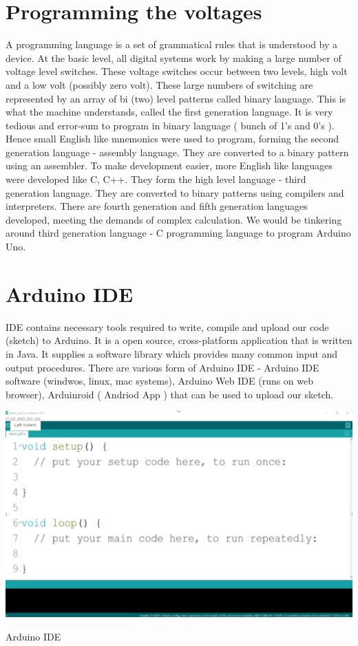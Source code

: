 \section{Programming the voltages}
\par A programming language is a set of grammatical rules that is understood by a device. At the basic level, all digital systems work by making a large number of voltage level switches. These voltage switches occur between two levels, high volt and a low volt (possibly zero volt). These large numbers of switching are represented by an array of bi (two) level patterns called binary language. This is what the machine understands, called the first generation language. It is very tedious and error-sum to program in binary language ( bunch of 1’s and 0’s ). Hence small English like mnemonics were used to program, forming the second generation language - assembly language. They are converted to a binary pattern using an assembler. To make development easier, more English like languages were developed like C, C++. They form the high level language - third generation language. They are converted to binary patterns using compilers and interpreters. There are fourth generation and fifth generation languages developed, meeting the demands of complex calculation. We would be tinkering around third generation language - C programming language to program Arduino Uno.

\section{Arduino IDE}


\par \ac{IDE} contains necessary tools required to write, compile and upload our code (sketch) to Arduino. It is a open source, cross-platform application that is written in Java. It supplies a software library which provides many common input and output procedures. There are various form of Arduino \ac{IDE} - Arduino \ac{IDE} software (windwos, linux, mac systems), Arduino Web \ac{IDE} (runs on web browser), Arduinroid ( Andriod App ) that can be used to upload our sketch.

\begin{marginfigure}
    \vspace{-4cm} \includegraphics{Images/Programing_Arduino/IDE_interface.png}
    \caption{Arduino IDE}
\end{marginfigure}

